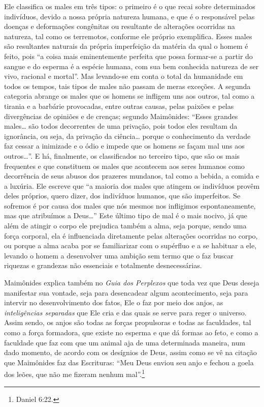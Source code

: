Ele classifica os males em três tipos: o primeiro é o que recai sobre
determinados indivíduos, devido a nossa própria natureza humana, e que é
o responsável pelas doenças e deformações congênitas ou resultante de
alterações ocorridas na natureza, tal como os terremotos, conforme ele
próprio exemplifica. Esses males são resultantes naturais da própria
imperfeição da matéria da qual o homem é feito, pois ``a coisa mais
eminentemente perfeita que possa formar-se a partir do sangue e do
esperma é a espécie humana, com sua bem conhecida natureza de ser vivo,
racional e mortal''. Mas levando-se em conta o total da humanidade em
todos os tempos, tais tipos de males não passam de meras exceções. A
segunda categoria abrange os males que os homens se infligem uns aos
outros, tal como a tirania e a barbárie provocadas, entre outras causas,
pelas paixões e pelas divergências de opiniões e de crenças; segundo
Maimônides: ``Esses grandes males\ldots{} são todos decorrentes de uma
privação, pois todos eles resultam da ignorância, ou seja, da privação
da ciência\ldots{} porque o conhecimento da verdade faz cessar a inimizade
e o ódio e impede que os homens se façam mal uns aos outros\ldots{}''. E há,
finalmente, os classificados no terceiro tipo, que são os mais
frequentes e que constituem os males que acontecem aos seres humanos
como decorrência de seus abusos dos prazeres mundanos, tal como a
bebida, a comida e a luxúria. Ele escreve que ``a maioria dos males que
atingem os indivíduos provêm deles próprios, quero dizer, dos indivíduos
humanos, que são imperfeitos. Se sofremos é por causa dos males que nós
mesmos nos infligimos espontaneamente, mas que atribuímos a Deus\ldots{}''
Este último tipo de mal é o mais nocivo, já que além de atingir o corpo
ele prejudica também a alma, seja porque, sendo uma força corporal, ela
é influenciada diretamente pelas alterações ocorridas no corpo, ou
porque a alma acaba por se familiarizar com o supérfluo e a se habituar
a ele, levando o homem a desenvolver uma ambição sem termo que o faz
buscar riquezas e grandezas não essenciais e totalmente desnecessárias.

Maimônides explica também no \emph{Guia dos Perplexos} que toda vez que
Deus deseja manifestar sua vontade, seja para desencadear algum
acontecimento, seja para intervir no desenvolvimento dos fatos, Ele o
faz por meio dos anjos, as \emph{inteligências separadas} que Ele cria e
das quais se serve para reger o universo. Assim sendo, os anjos são
todas as forças propulsoras e todas as faculdades, tal como a força
formadora, que existe no esperma e que dá formas ao feto, e como a faculdade 
que faz com que um animal aja de uma
determinada maneira, num dado momento, de acordo com os desígnios de
Deus, assim como se vê na citação que Maimônides faz das Escrituras:
``Meu Deus enviou seu anjo e fechou a goela dos leões, que não me
fizeram nenhum mal''.\footnote{Daniel 6:22.}

